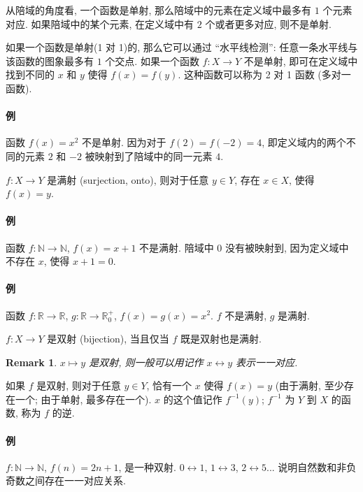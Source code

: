 \documentclass[UTF8]{ctexart}
\theoremstyle{mystyle}
\theoremstyle{myremark}
\newtheorem*{remark}{Remark}
\theoremstyle{plain}
\newcommand{\R}{\mathbb R}
\newcommand{\N}{\mathbb N}
\begin{document}
从陪域的角度看, 一个函数是单射, 那么陪域中的元素在定义域中最多有 $ 1 $ 个元素对应. 如果陪域中的某个元素, 在定义域中有 $ 2 $ 个或者更多对应, 则不是单射.

如果一个函数是单射(1 对 1)的, 那么它可以通过 ``水平线检测'': 任意一条水平线与该函数的图象最多有 $ 1 $ 个交点. 如果一个函数 $ f \colon X \to Y $ 不是单射, 即可在定义域中找到不同的 $ x $ 和 $ y $ 使得 $ f(x) = f(y) $. 这种函数可以称为 2 对 1 函数 (多对一函数).

\paragraph{例}
函数 $ f(x) = x^2 $ 不是单射. 因为对于 $ f(2) = f(-2) = 4 $, 即定义域内的两个不同的元素 $ 2 $ 和 $ -2 $ 被映射到了陪域中的同一元素 $ 4 $.

\begin{definition}[\text{满射/映上}]
    $ f \colon X \to Y $ 是满射 (surjection, onto), 则对于任意 $ y \in Y $, 存在 $ x \in X $, 使得 $ f(x) = y $.
\end{definition}

\paragraph{例}
函数 $ f \colon \N \to \N $, $ f(x) = x + 1 $ 不是满射. 陪域中 $ 0 $ 没有被映射到, 因为定义域中不存在 $ x $, 使得 $ x + 1 = 0 $.

\paragraph{例}
函数 $ f \colon \R \to \R $, $ g: \R \to \R_0^+ $, $ f(x) = g(x) = x^2 $. $ f $ 不是满射, $ g $ 是满射.


\begin{definition}
    $ f \colon X \to Y $ 是双射 (bijection), 当且仅当 $ f $ 既是双射也是满射.
\end{definition}

\begin{remark}
    $ x \mapsto y $ 是双射, 则一般可以用记作 $ x \leftrightarrow y $ 表示一一对应.
\end{remark}

如果 $ f $ 是双射, 则对于任意 $ y \in Y $, 恰有一个 $ x $ 使得 $ f(x) = y $ (由于满射, 至少存在一个; 由于单射, 最多存在一个). $ x $ 的这个值记作 $ f^{-1}(y) $; $ f^{-1} $ 为 $ Y $ 到 $ X $ 的函数, 称为 $ f $ 的逆.

\paragraph{例}
$ f \colon \N \to \N $, $ f(n) = 2 n + 1 $, 是一种双射. $ 0 \leftrightarrow 1 $, $ 1 \leftrightarrow 3 $, $ 2 \leftrightarrow 5 $... 说明自然数和非负奇数之间存在一一对应关系.
\end{document}
